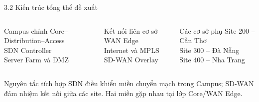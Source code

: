 \begin{frame}{3.2 Kiến trúc tổng thể đề xuất}
    \begin{columns}[T]
        \begin{block}{Campus chính}
            \centering
            Core--Distribution--Access\\
            SDN Controller\\
            Server Farm và DMZ
        \end{block}

        \begin{block}{Kết nối liên cơ sở}
            \centering
            WAN Edge\\
            Internet và MPLS\\
            SD-WAN Overlay
        \end{block}

        \begin{block}{Các cơ sở phụ}
            \centering
            Site 200 -- Cần Thơ\\
            Site 300 -- Đà Nẵng\\
            Site 400 -- Nha Trang
        \end{block}
    \end{columns}
    \vspace{0.2cm}
    \begin{block}{Nguyên tắc tích hợp}
        SDN điều khiển miền chuyển mạch trong Campus; SD-WAN đảm nhiệm kết nối giữa các site. Hai miền gặp nhau tại lớp Core/WAN Edge.
    \end{block}
\end{frame}

